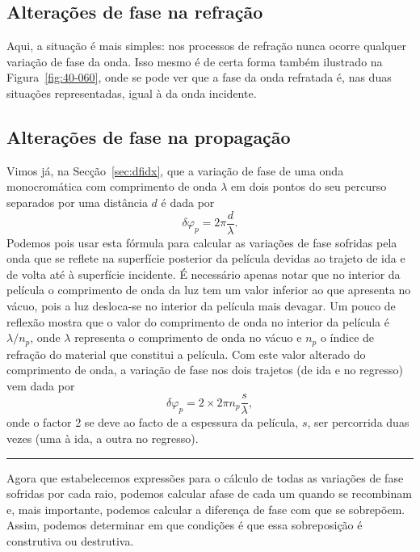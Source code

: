 \subsection*{Alterações de fase na refração}
Aqui, a situação é mais simples: nos processos de refração nunca ocorre qualquer
variação de fase da onda. Isso mesmo é de certa forma também ilustrado na
Figura~\ref{fig:40-060}, onde se pode ver que a fase da onda refratada é, nas
duas situações representadas, igual à da onda incidente.

\subsection*{Alterações de fase na propagação}
Vimos já, na Secção~\ref{sec:dfidx}, que a variação de fase de uma onda
monocromática com comprimento de onda $\lambda$ em dois pontos do seu percurso
separados por uma distância $d$ é dada por
\begin{equation*}
    \delta\varphi_p=2\pi\frac{d}{\lambda}.
\end{equation*}
Podemos pois usar esta fórmula para calcular as variações de fase sofridas pela
onda que se reflete na superfície posterior da película devidas ao trajeto de
ida e de volta até à superfície incidente. É necessário apenas notar que no
interior da película o comprimento de onda da luz tem um valor inferior ao que
apresenta no vácuo, pois a luz desloca-se no interior da película mais devagar.
Um pouco de reflexão mostra que o valor do comprimento de onda no interior da
película é $\lambda/n_p$, onde $\lambda$ representa o comprimento de onda no
vácuo e $n_p$ o índice de refração do material que constitui a película. Com
este valor alterado do comprimento de onda, a variação de fase nos dois
trajetos (de ida e no regresso) vem dada por
\begin{equation*}
\delta\varphi_p=2\times2\pi n_p\frac{s}{\lambda},
\end{equation*}
onde o factor 2 se deve ao facto de a espessura da película, $s$, ser percorrida
duas vezes (uma à ida, a outra no regresso).
\begin{center}
    \rule{2cm}{0.1mm}
\end{center}

Agora que estabelecemos expressões para o cálculo de todas as variações de fase
sofridas por cada raio, podemos calcular afase de cada um quando se recombinam
e, mais importante, podemos calcular a diferença de fase com que se sobrepõem.
Assim, podemos determinar em que condições é que essa sobreposição é construtiva
ou destrutiva.

